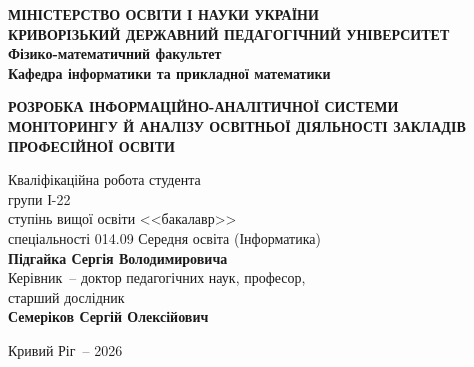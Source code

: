 \thispagestyle{empty}
\begin{titlepage}
\begin{center}
{\bfseries МІНІСТЕРСТВО ОСВІТИ І НАУКИ УКРАЇНИ}\\[2pt]
{\bfseries КРИВОРІЗЬКИЙ ДЕРЖАВНИЙ ПЕДАГОГІЧНИЙ УНІВЕРСИТЕТ}\\[6pt]
\textbf{Фізико-математичний факультет}\\[2pt]
\textbf{Кафедра інформатики та прикладної математики}
\end{center}

\vspace{4cm}

\begin{center}
{\large\bfseries\MakeUppercase{Розробка інформаційно-аналітичної системи моніторингу й аналізу освітньої діяльності закладів професійної освіти}}
\end{center}

\vspace{2cm}

\noindent\hfill\begin{minipage}{0.62\linewidth}
Кваліфікаційна робота студента\\[2pt]
групи І-22\\[2pt]
ступінь вищої освіти <<бакалавр>>\\[2pt]
спеціальності 014.09 Середня освіта (Інформатика)\\[6pt]
\textbf{Підгайка Сергія Володимировича}\\[12pt]
Керівник~-- доктор педагогічних наук, професор,\\[2pt]
старший дослідник\\[2pt]
\textbf{Семеріков Сергій Олексійович}
\end{minipage}

\vfill

\begin{center}
Кривий Ріг~-- 2026
\end{center}

\end{titlepage}
\clearpage
